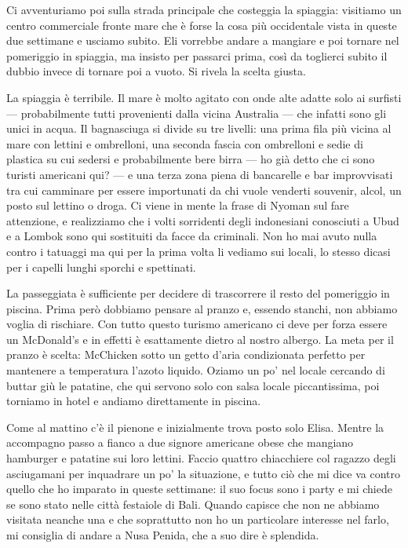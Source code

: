 Ci avventuriamo poi sulla strada principale che costeggia la spiaggia: visitiamo un centro commerciale fronte mare che è forse la cosa più occidentale vista in queste due settimane e usciamo subito. Eli vorrebbe andare a mangiare e poi tornare nel pomeriggio in spiaggia, ma insisto per passarci prima, così da toglierci subito il dubbio invece di tornare poi a vuoto. Si rivela la scelta giusta.

La spiaggia è terribile. Il mare è molto agitato con onde alte adatte solo ai surfisti — probabilmente tutti provenienti dalla vicina Australia — che infatti sono gli unici in acqua. Il bagnasciuga si divide su tre livelli: una prima fila più vicina al mare con lettini e ombrelloni, una seconda fascia con ombrelloni e sedie di plastica su cui sedersi e probabilmente bere birra — ho già detto che ci sono turisti americani qui? — e una terza zona piena di bancarelle e bar improvvisati tra cui camminare per essere importunati da chi vuole venderti souvenir, alcol, un posto sul lettino o droga. Ci viene in mente la frase di Nyoman sul fare attenzione, e realizziamo che i volti sorridenti degli indonesiani conosciuti a Ubud e a Lombok sono qui sostituiti da facce da criminali. Non ho mai avuto nulla contro i tatuaggi ma qui per la prima volta li vediamo sui locali, lo stesso dicasi per i capelli lunghi sporchi e spettinati.

La passeggiata è sufficiente per decidere di trascorrere il resto del pomeriggio in piscina. Prima però dobbiamo pensare al pranzo e, essendo stanchi, non abbiamo voglia di rischiare. Con tutto questo turismo americano ci deve per forza essere un McDonald's e in effetti è esattamente dietro al nostro albergo. La meta per il pranzo è scelta: McChicken sotto un getto d'aria condizionata perfetto per mantenere a temperatura l'azoto liquido. Oziamo un po' nel locale cercando di buttar giù le patatine, che qui servono solo con salsa locale piccantissima, poi torniamo in hotel e andiamo direttamente in piscina.

Come al mattino c'è il pienone e inizialmente trova posto solo Elisa. Mentre la accompagno passo a fianco a due signore americane obese che mangiano hamburger e patatine sui loro lettini. Faccio quattro chiacchiere col ragazzo degli asciugamani per inquadrare un po' la situazione, e tutto ciò che mi dice va contro quello che ho imparato in queste settimane: il suo focus sono i party e mi chiede se sono stato nelle città festaiole di Bali. Quando capisce che non ne abbiamo visitata neanche una e che soprattutto non ho un particolare interesse nel farlo, mi consiglia di andare a Nusa Penida, che a suo dire è splendida.

